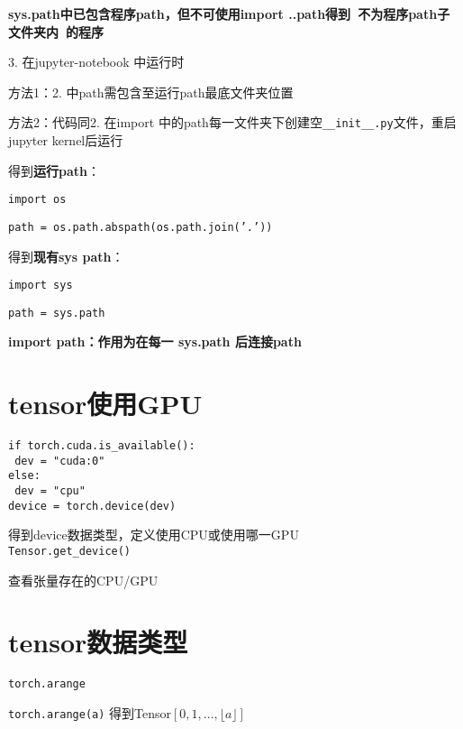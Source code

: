 \documentclass[UTF8]{ctexart}
\begin{document}
  \quad \textbf{sys.path中已包含程序path，但不可使用import ..path得到\ 不为程序path子文件夹内\ 的程序}

  3. 在jupyter-notebook 中运行时

  \quad 方法1：2. 中path需包含至运行path最底文件夹位置

  \quad 方法2：代码同2. 在import 中的path每一文件夹下创建空\texttt{\_\_init\_\_.py}文件，重启jupyter kernel后运行

  得到\textbf{运行path}：

  \quad \texttt{import os}

  \quad \texttt{path = os.path.abspath(os.path.join('.'))}

  得到\textbf{现有sys path}：

  \quad \texttt{import sys}

  \quad \texttt{path = sys.path}

  \textbf{import path：作用为在每一 sys.path 后连接path}


\section{tensor使用GPU}
\noindent \texttt{}
\texttt{if torch.cuda.is\_available():}\\
\texttt{  dev = "cuda:0"}\\
\texttt{else:}\\
\texttt{  dev = "cpu"}\\
\texttt{device = torch.device(dev)}

  得到device数据类型，定义使用CPU或使用哪一GPU\\
\texttt{Tensor.get\_device()}

  查看张量存在的CPU/GPU



\section{tensor数据类型}
\noindent \texttt{torch.arange}

  \texttt{torch.arange(a)} 得到Tensor$[0, 1, ..., \lfloor a \rfloor]$
\end{document}
